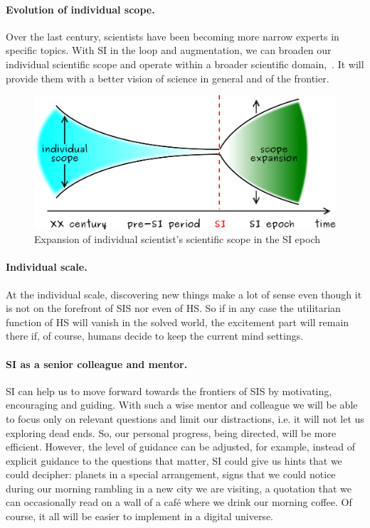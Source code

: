\documentclass[a4paper,11pt]{article}
\begin{document}
\paragraph{Evolution of individual scope.} 
Over the last century, scientists have been becoming more narrow experts in specific topics. With SI in the loop and augmentation, we can broaden our individual scientific scope and operate within a broader scientific domain,~. It will provide them with a better vision of science in general and of the frontier.

\begin{figure}
    \includegraphics[width=1\textwidth]{scope}
    \caption{\label{fig:scope}Expansion of individual scientist's scientific scope in the SI epoch}
\end{figure}

\paragraph{Individual scale.}

At the individual scale, discovering new things make a lot of sense even though it is not on the forefront of SIS nor even of HS. So if in any case the utilitarian function of HS will vanish in the solved world, the excitement part will remain there if, of course, humans decide to keep the current mind settings.

\paragraph{SI as a senior colleague and mentor.}
SI can help us to move forward towards the frontiers of SIS by motivating, encouraging and guiding. With such a wise mentor and colleague we will be able to focus only on relevant questions and limit our distractions, i.e. it will not let us exploring dead ends. So, our personal progress, being directed, will be more efficient. However, the level of guidance can be adjusted, for example, instead of explicit guidance to the questions that matter, SI could give us hints that we could decipher: planets in a special arrangement, signs that we could notice during our morning rambling in a new city we are visiting, a quotation that we can occasionally read on a wall of a café where we drink our morning coffee. Of course, it all will be easier to implement in a digital universe.
\end{document}
